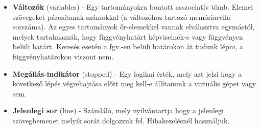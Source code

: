 \begin{itemize}
        \item \textbf{Változók} (variables) - Egy tartományokra bontott asszociatív tömb. Elemei szövegeket párosítanak számokkal (a változóhoz tartozó memóriacella sorszáma). Az egyes tartományok őr-elemekkel vannak elválasztva egymástól, melyek tartalmazzák, hogy függvényhatárt képviselnek-e vagy függvényen belüli határt. Keresés esetén a fgv.-en belüli határokon át tudunk lépni, a függvényhatárokon viszont nem.
        \item \textbf{Megállás-indikátor} (stopped) - Egy logikai érték, mely azt jelzi hogy a következő lépés végrehajtása előtt meg kell-e állítanunk a virtuális gépet vagy sem.
        \item \textbf{Jelenlegi sor} (line) - Számláló, mely nyilvántartja hogy a jelenlegi szövegbemenet melyik sorát dolgozzuk fel. Hibakezelésnél használjuk. 
\end{itemize}